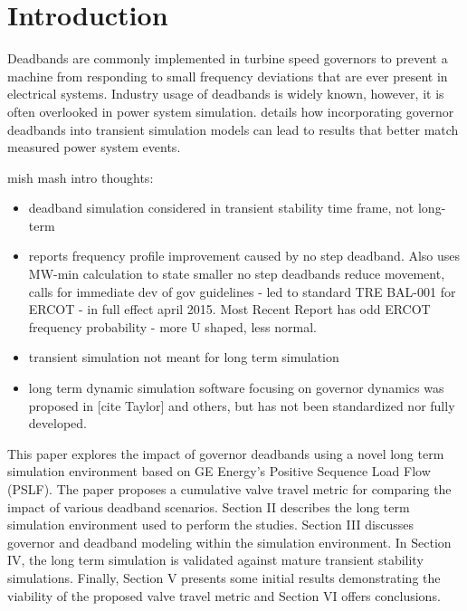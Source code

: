 \section{Introduction}
Deadbands are commonly implemented in turbine speed governors to prevent a machine from responding to small frequency deviations that are ever present in electrical systems.
Industry usage of deadbands is widely known, however, it is often overlooked in power system simulation.
\cite{kou2016} details how incorporating governor deadbands into transient simulation models can lead to results that better match measured power system events.


mish mash intro thoughts:
\begin{itemize}
	\item deadband simulation considered in transient stability time frame, not long-term
	\item \cite{nercFRI2012} reports frequency profile improvement caused by no step deadband. Also uses MW-min calculation to state smaller no step deadbands reduce movement, calls for immediate dev of gov guidelines - led to standard TRE BAL-001 for ERCOT - in full effect april 2015. Most Recent Report \cite{nercFRAA2018} has odd ERCOT frequency probability - more U shaped, less normal.
	\item transient simulation not meant for long term simulation
	\item long term dynamic simulation software focusing on governor dynamics was proposed in [cite Taylor] and others, but has not been standardized nor fully developed.
\end{itemize}


This paper explores the impact of governor deadbands using a novel long term simulation environment based on GE Energy's Positive Sequence Load Flow (PSLF). 
The paper proposes a cumulative valve travel metric for comparing the impact of various deadband scenarios. 
Section II describes the long term simulation environment used to perform the studies. 
Section III discusses governor and deadband modeling within the simulation environment. 
In Section IV, the long term simulation is validated against mature transient stability simulations. 
Finally, Section V presents some initial results demonstrating the viability of the proposed valve travel metric and Section VI offers conclusions.


